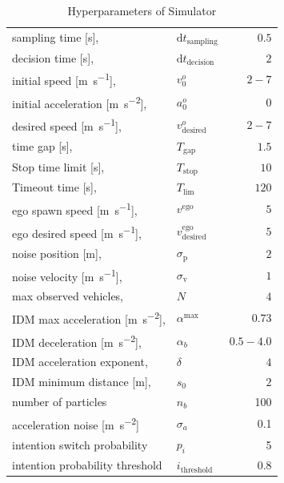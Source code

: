 \begin{table}[!bt]
	\renewcommand{\arraystretch}{1.2}
	\caption{Hyperparameters of Simulator}
	\label{tab:hyperparameters}
	\centering
	\begin{tabular}{l l r}
		\toprule
		sampling time [\si{\second}], & $\mathrm{d}t_\mathrm{sampling}$ & $0.5$\\
		decision time [\si{\second}], & $\mathrm{d}t_\mathrm{decision}$ & $2$\\
		initial speed [\si{\meter\per\second}], & $v^o_0 $ & $2-7$\\
		initial acceleration [\si{\meter\per\second\squared}], & $a^o_0 $ & $0$\\
		desired speed [\si{\meter\per\second}], & $v_\mathrm{desired}^o$ & $2-7$\\
		time gap [\si{\second}], & $T_\mathrm{gap}$ & $1.5$\\
		Stop time limit [\si{\second}], & $T_\mathrm{stop}$ & $10$\\
		Timeout time [\si{\second}], & $T_\mathrm{lim}$ & $120$\\
		ego spawn speed [\si{\meter\per\second}], & $v^\mathrm{ego}$ & $5$\\
		ego desired speed [\si{\meter\per\second}], & $v^\mathrm{ego}_\mathrm{desired}$ & $5$\\
		noise position [\si{\meter}], & $\sigma_\mathrm{p}$ & $2$\\ 
		noise velocity [\si{\meter\per\second}], & $\sigma_\mathrm{v}$ & $1$\\ 
		max observed vehicles, & $N$ & $4$\\ 

        \midrule
        IDM max acceleration [\si{\meter\per\second\squared}], & $\alpha^{\mathrm{max}} $ & $0.73$\\
        IDM deceleration [\si{\meter\per\second\squared}], & $\alpha_b $ & $0.5 - 4.0$\\
        IDM acceleration exponent, & $\delta$ & $4$\\
        IDM minimum distance [\si{\meter}], & $s_0$ & $2$\\
		\midrule
		
		number of particles & $n_b$ & 100\\
		acceleration noise [\si{\meter\per\second\squared}] & $\sigma_a$ & 0.1 \\
		intention switch probability & $p_i$ & 5 \\
		intention probability threshold & $i_\text{threshold}$ & 0.8 \\
		\midrule
		

\end{tabular}
\end{table}
